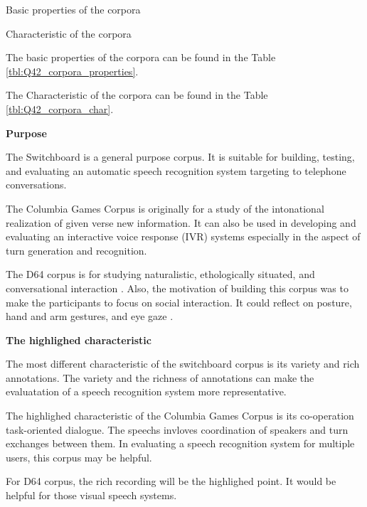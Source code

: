 \documentclass[12pt]{article}
\newenvironment{problem}[2][Problem]{\begin{trivlist}
\item[\hskip \labelsep {\bfseries #1}\hskip \labelsep {\bfseries #2.}]}{\end{trivlist}}
\begin{document}
\begin{problem}{4.2}
    \begin{table}
        \centering
        \caption{Basic properties of the corpora}
        \label{tbl:Q42_corpora_properties}    
    \end{table}

    \begin{table}
        \centering
        \caption{Characteristic of the corpora}
        \label{tbl:Q42_corpora_char}    
    \end{table}

    The basic properties of the corpora can be found in the Table \ref{tbl:Q42_corpora_properties}.

    The Characteristic of the corpora can be found in the Table \ref{tbl:Q42_corpora_char}.

\noindent\textbf{Purpose}

    The Switchboard is a general purpose corpus. It is suitable for building,
    testing, and evaluating an automatic speech recognition system targeting to 
    telephone conversations. \cite{switchboard_intro}

    The Columbia Games Corpus is originally for a study of the intonational 
    realization of given verse new information. 
    It can also be used in developing and evaluating an interactive voice 
    response (IVR) systems especially in the aspect of turn generation and recognition.
    \cite{moller2007evaluating}

    The D64 corpus is for studying naturalistic, ethologically situated, 
    and conversational interaction \cite{oertel2013d64}. Also, 
    the motivation of building this corpus was to make the participants to focus
    on social interaction. It could reflect on posture, hand and arm gestures, 
    and eye gaze \cite{oertel2013d64}.

\noindent\textbf{The highlighed characteristic}
    
    The most different characteristic of the switchboard corpus is its variety
    and rich annotations. The variety and the richness of annotations can make
    the evaluatation of a speech recognition system more representative.

    The highlighed characteristic of the Columbia Games Corpus is its co-operation
    task-oriented dialogue. The speechs invloves coordination of speakers and 
    turn exchanges between them. In evaluating a speech recognition system for 
    multiple users, this corpus may be helpful.

    For D64 corpus, the rich recording will be the highlighed point. It would be
    helpful for those visual speech systems.

\end{problem}
\end{document}
